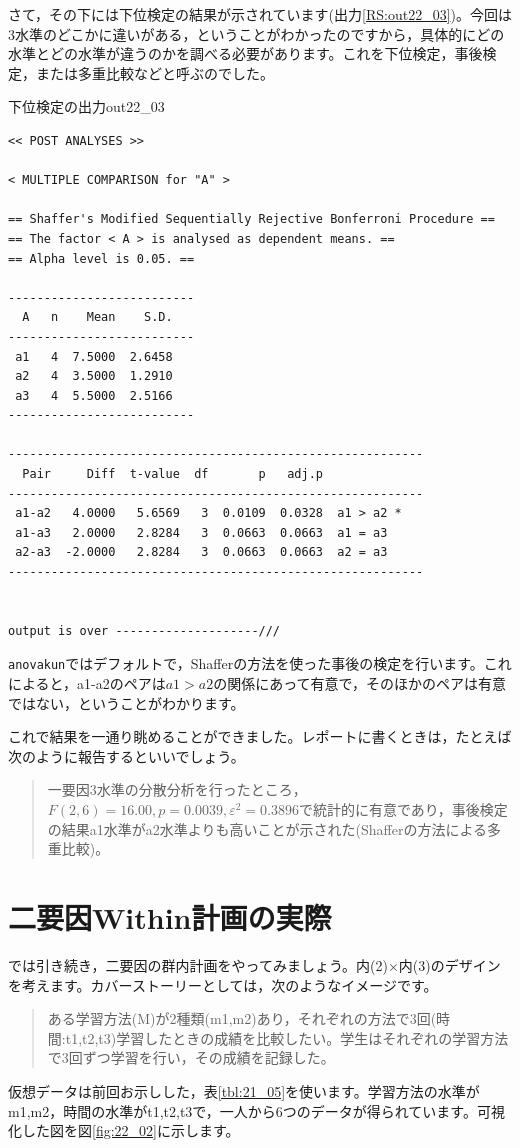 \documentclass{ltjbook}
\begin{document}
さて，その下には下位検定の結果が示されています(出力\ref{RS:out22_03})。今回は3水準のどこかに違いがある，ということがわかったのですから，具体的にどの水準とどの水準が違うのかを調べる必要があります。これを下位検定，事後検定，または多重比較などと呼ぶのでした。

\begin{Rscreen}{下位検定の出力}{out22_03}
\begin{verbatim}
<< POST ANALYSES >>

< MULTIPLE COMPARISON for "A" >

== Shaffer's Modified Sequentially Rejective Bonferroni Procedure ==
== The factor < A > is analysed as dependent means. == 
== Alpha level is 0.05. == 
 
--------------------------
  A   n    Mean    S.D. 
--------------------------
 a1   4  7.5000  2.6458 
 a2   4  3.5000  1.2910 
 a3   4  5.5000  2.5166 
--------------------------

----------------------------------------------------------
  Pair     Diff  t-value  df       p   adj.p            
----------------------------------------------------------
 a1-a2   4.0000   5.6569   3  0.0109  0.0328  a1 > a2 * 
 a1-a3   2.0000   2.8284   3  0.0663  0.0663  a1 = a3   
 a2-a3  -2.0000   2.8284   3  0.0663  0.0663  a2 = a3   
----------------------------------------------------------


output is over --------------------///

\end{verbatim}
\end{Rscreen}

\verb|anovakun|ではデフォルトで，Shafferの方法を使った事後の検定を行います。これによると，a1-a2のペアは$a1 > a2$の関係にあって有意で，そのほかのペアは有意ではない，ということがわかります。

これで結果を一通り眺めることができました。レポートに書くときは，たとえば次のように報告するといいでしょう。
\begin{quote}
	一要因3水準の分散分析を行ったところ，$F(2,6)=16.00,p=0.0039,\varepsilon^2=0.3896$で統計的に有意であり，事後検定の結果a1水準がa2水準よりも高いことが示された(Shafferの方法による多重比較)。
\end{quote}


\section{二要因Within計画の実際}
では引き続き，二要因の群内計画をやってみましょう。内(2)$\times$内(3)のデザインを考えます。カバーストーリーとしては，次のようなイメージです。
\begin{quote}
    ある学習方法(M)が2種類(m1,m2)あり，それぞれの方法で3回(時間:t1,t2,t3)学習したときの成績を比較したい。学生はそれぞれの学習方法で3回ずつ学習を行い，その成績を記録した。
\end{quote}
仮想データは前回お示しした，表\ref{tbl:21_05}を使います。学習方法の水準がm1,m2，時間の水準がt1,t2,t3で，一人から6つのデータが得られています。可視化した図を図\ref{fig:22_02}に示します。
\end{document}
